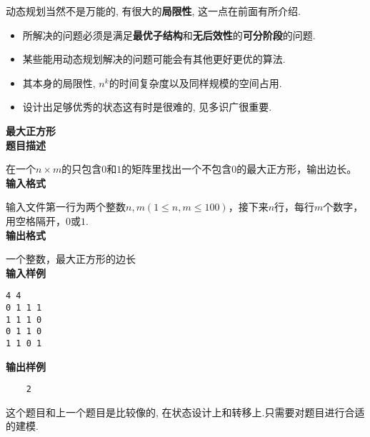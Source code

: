 动态规划当然不是万能的, 有很大的\textbf{局限性}, 这一点在前面有所介绍.
\begin{itemize}
	\item{所解决的问题必须是满足\textbf{最优子结构}和\textbf{无后效性}的\textbf{可分阶段}的问题.}
	\item{某些能用动态规划解决的问题可能会有其他更好更优的算法.}
	\item{其本身的局限性, $n^k$的时间复杂度以及同样规模的空间占用.}
	\item{设计出足够优秀的状态这有时是很难的, 见多识广很重要.}
\end{itemize}
\newpage
\begin{example}\textbf{最大正方形}\\
	\textbf{题目描述}
	
	在一个$n\times m$的只包含$0$和$1$的矩阵里找出一个不包含$0$的最大正方形，输出边长。\\
	\textbf{输入格式}
	
	输入文件第一行为两个整数$n,m(1\leq n,m\leq 100)$，接下来$n$行，每行$m$个数字，用空格隔开，$0$或$1$.\\
	\textbf{输出格式}
	
	一个整数，最大正方形的边长\\
	\textbf{输入样例}
	
	\begin{verbatim}
4 4
0 1 1 1
1 1 1 0
0 1 1 0
1 1 0 1
	\end{verbatim}
	\textbf{输出样例}
	\begin{verbatim}
	2
	\end{verbatim}
	
\end{example}

这个题目和上一个题目是比较像的, 在状态设计上和转移上.只需要对题目进行合适的建模.

